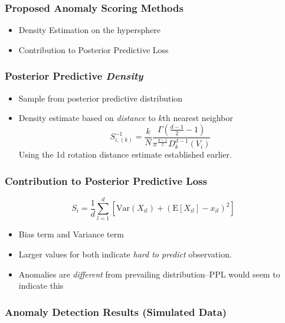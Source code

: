 \documentclass[aspectratio=169]{beamer}
\begin{document}
\begin{frame}
  \frametitle{Proposed Anomaly Scoring Methods}
  \begin{itemize}
    \item Density Estimation on the hypersphere
    \item Contribution to Posterior Predictive Loss
  \end{itemize}
\end{frame}

\begin{frame}
  \frametitle{Posterior Predictive \emph{Density}}
  \begin{itemize}
    \item Sample from posterior predictive distribution
    \item Density estimate based on \emph{distance} to $k$th nearest neighbor
    \begin{equation*}
        S_{i,(k)}^{-1} =
          \frac{k}{N}\frac{\Gamma\left(\frac{d-1}{2} - 1\right)}{\pi^{\frac{d-1}{2}}D_{k}^{d-1}(V_i)}
    \end{equation*}
    Using the 1d rotation distance estimate established earlier.
  \end{itemize}
\end{frame}

\begin{frame}
    \frametitle{Contribution to Posterior Predictive Loss}
    \begin{equation*}
         S_{i} = \frac{1}{d}\sum_{l = 1}^{d}\left[\text{Var}(X_{il}) +
                        \left(\text{E}[X_{il}] - x_{il}\right)^2\right]
    \end{equation*}
    \begin{itemize}
        \item Bias term and Variance term
        \item Larger values for both indicate \emph{hard to predict} observation.
        \item Anomalies are \emph{different} from prevailing distribution--PPL would seem to indicate this
    \end{itemize}
\end{frame}

\begin{frame}
  \frametitle{Anomaly Detection Results (Simulated Data)}
  \begin{center}
    
  \end{center}
\end{frame}
\end{document}
